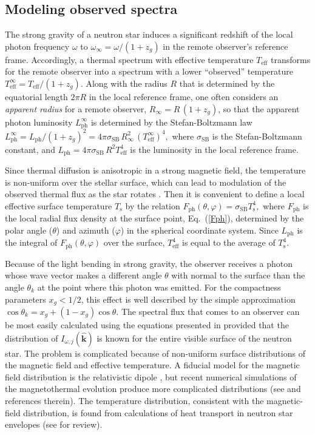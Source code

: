 \documentclass{pos1}
\newcommand{\req}[1]{Eq.~(\ref{#1})}
\newcommand{\khat}{\hat{\mathbf{k}}}
\newcommand{\sSB}{\sigma_\mathrm{SB}}
\newcommand{\Teff}{T_\mathrm{eff}}
\newcommand{\Ts}{T_\mathrm{s}}
\begin{document}
\subsection{Modeling observed spectra}
\label{sec:models}

The strong gravity of a neutron star induces a significant redshift of
the local photon frequency $\omega$ to  $\omega_\infty =
\omega/(1+z_g)$ in the remote observer's reference frame. Accordingly,
a thermal spectrum with effective temperature $\Teff$ transforms for
the remote observer into a spectrum with a lower ``observed''
temperature $\Teff^\infty = \Teff / (1+z_g)$.  Along with the radius
$R$ that is determined by the equatorial length $2\pi R$ in the local
reference frame, one often considers an \emph{apparent radius} for a
remote observer, $ R_\infty = R \,(1+z_g)$, so that the apparent
photon luminosity $L_\mathrm{ph}^\infty$ is determined by the
Stefan-Boltzmann law $ L_\mathrm{ph}^\infty = L_\mathrm{ph}/(1+z_g)^2
=4\pi\sSB\,R_\infty^2 \,(\Teff^\infty)^4, $ where $\sSB$ is the
Stefan-Boltzmann constant, and $L_\mathrm{ph} = 4\pi \sSB\,R^2
\Teff^4$ is the luminosity in the local reference frame.

Since thermal diffusion is anisotropic in a strong magnetic field, the
temperature is non-uniform over the stellar surface, which can lead to
modulation of the observed thermal flux as the star rotates
\cite{GreensteinHartke}. Then it is convenient to define a local
effective surface temperature $\Ts$ by the relation $
F_\mathrm{ph}(\theta,\varphi) = \sSB\Ts^4, $ where $F_\mathrm{ph}$
is the local radial flux density at the surface point, \req{Fph},
determined by the polar angle ($\theta$) and azimuth ($\varphi$) in
the spherical coordinate system. Since $L_\mathrm{ph}$ is the integral
of $F_\mathrm{ph}(\theta,\varphi)$ over the surface, $\Teff^4$ is
equal to the average of $\Ts^4$.

Because of the light bending in strong gravity, the observer receives
a photon whose wave vector makes a different angle $\theta$ with
normal to the surface than the angle $\theta_k$ at the point where
this photon was emitted. For the compactness parameters $x_g<1/2$,
this effect is well described by the simple approximation
\cite{Beloborodov02} $ \cos\theta_k = x_g + (1-x_g)\cos\theta$. The
spectral flux that comes to an observer can be most easily calculated
using the equations presented in \cite{PoutanenBeloborodov06} provided
that the distribution of $I_{\omega,j}(\khat)$ is known for the entire
visible surface of the neutron star. The problem is complicated
because of non-uniform surface distributions of the magnetic field and
effective temperature. A fiducial model for the magnetic field
distribution is the relativistic dipole \cite{GinzburgOzernoi}, but
recent numerical simulations of the magnetothermal evolution produce
more complicated distributions (see \cite{Vigano_ea13,Elfritz_ea16}
and references therein). The temperature distribution, consistent with
the magnetic-field distribution, is found from calculations of heat
transport in neutron star envelopes (see \cite{PPP15} for review).
\end{document}
